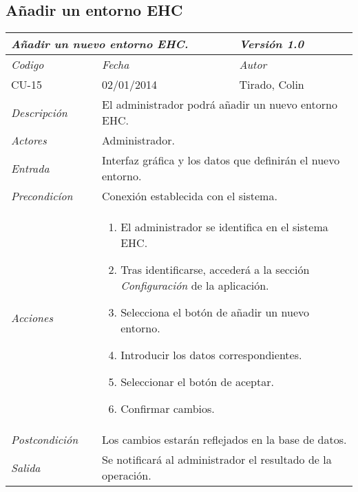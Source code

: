 \subsection{A\~nadir un entorno EHC}
\begin{center}
    \begin{tabular}{|p{3cm}|p{4cm}|p{4cm}|p{4cm}|}
    \hline \multicolumn{3}{|p{9cm}|}{\textit{A\~nadir un nuevo entorno EHC.}} & \textit{Versi\'on 1.0} \\
	\hline \textit{Codigo} & \textit{Fecha} & \multicolumn{2}{|p{6cm}|}{\textit{Autor}} \\
	CU-15 & 02/01/2014 & \multicolumn{2}{|p{6cm}|}{Tirado, Colin} \\		
    \hline \textit{Descripci\'on} & \multicolumn{3}{|p{9cm}|}{El administrador podr\'a a\~nadir un nuevo entorno EHC.} \\
    \hline \textit{Actores} & \multicolumn{3}{|p{9cm}|}{Administrador.} \\
    \hline \textit{Entrada} & \multicolumn{3}{|p{9cm}|}{Interfaz gr\'afica y los datos que definir\'an el nuevo entorno.} \\
    \hline \textit{Precondic\'ion} & \multicolumn{3}{|p{9cm}|}{Conexi\'on establecida con el sistema.} \\
    \hline \textit{Acciones} & \multicolumn{3}{|p{9cm}|}{
        \begin{enumerate}
        \item El administrador se identifica en el sistema EHC.
        \item Tras identificarse, acceder\'a a la secci\'on \textit{Configuraci\'on} de la aplicaci\'on.
        \item Selecciona el bot\'on de a\~nadir un nuevo entorno.
        \item Introducir los datos correspondientes.
        \item Seleccionar el bot\'on de aceptar.
        \item Confirmar cambios.
        \end{enumerate}
           } \\
    \hline \textit{Postcondici\'on} & \multicolumn{3}{|p{9cm}|}{Los cambios estar\'an reflejados en la base de datos.} \\
    \hline \textit{Salida} & \multicolumn{3}{|p{9cm}|}{Se notificar\'a al administrador el resultado de la operaci\'on.} \\ \hline
    \end{tabular}
\end{center}